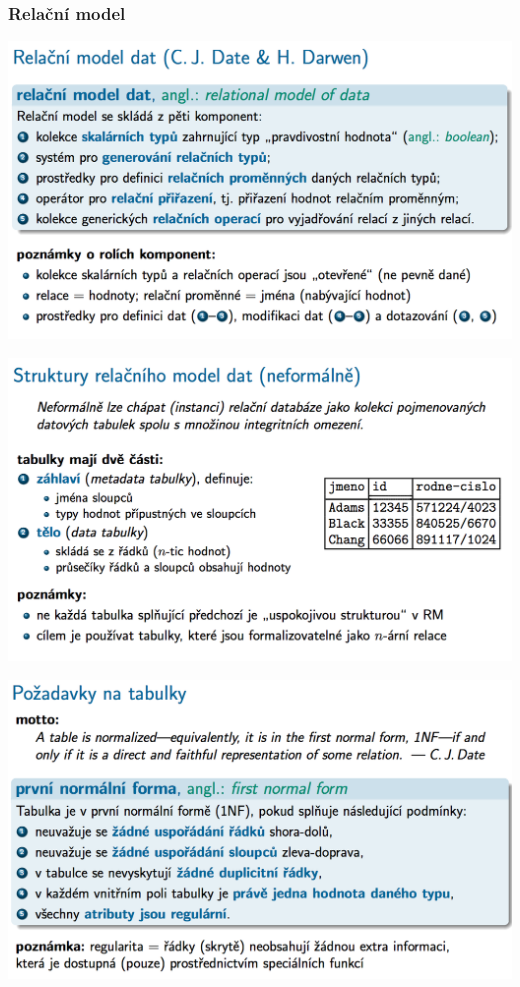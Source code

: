 \documentclass[10pt,a4paper]{article}
\begin{document}
\subsubsection{Relační model}
	\includegraphics[scale=0.4]{img/7}
	
	\includegraphics[scale=0.4]{img/8}
	
	\includegraphics[scale=0.4]{img/9}
\end{document}
